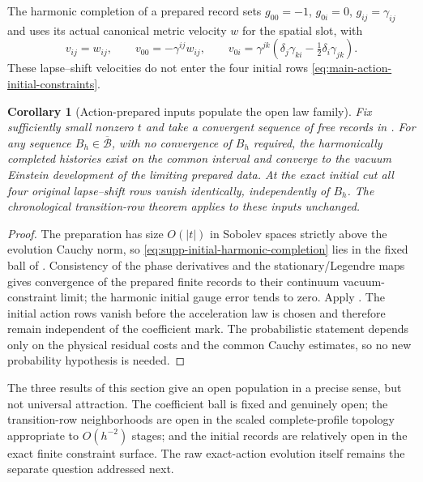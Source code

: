 \documentclass[11pt]{article}
\newtheorem{corollary}[corollary]{Corollary}
\theoremstyle{definition}
\theoremstyle{remark}
\begin{document}
The harmonic completion of a prepared record sets
$g_{00}=-1$, $g_{0i}=0$, $g_{ij}=\gamma_{ij}$ and uses its actual canonical
metric velocity $w$ for the spatial slot, with
\begin{equation}
 v_{ij}=w_{ij},\qquad
 v_{00}=-\gamma^{ij}w_{ij},\qquad
 v_{0i}=\gamma^{jk}\left(\delta_j\gamma_{ki}
             -\tfrac12\delta_i\gamma_{jk}\right).
 \label{eq:supp-initial-harmonic-completion}
\end{equation}
These lapse--shift velocities do not enter the four initial rows
\eqref{eq:main-action-initial-constraints}.

\begin{corollary}[Action-prepared inputs populate the open law family]
\label{cor:supp-action-prepared-einstein}
Fix sufficiently small nonzero $t$ and take a convergent sequence of free
records in .  For any sequence
$B_h\in\overline{\mathcal B}$, with no convergence of $B_h$ required, the
harmonically completed histories exist on the common interval and converge to
the vacuum Einstein development of the limiting prepared data.  At the exact
initial cut all four original lapse--shift rows vanish identically,
independently of $B_h$.  The chronological transition-row theorem
 applies to these inputs unchanged.
\end{corollary}
\begin{proof}
The preparation has size $O(|t|)$ in Sobolev spaces strictly above the
evolution Cauchy norm, so \eqref{eq:supp-initial-harmonic-completion} lies in
the fixed ball of .  Consistency of the phase
derivatives and the stationary/Legendre maps gives convergence of the
prepared finite records to their continuum vacuum-constraint limit; the
harmonic initial gauge error tends to zero.  Apply
.  The initial action rows vanish before the
acceleration law is chosen and therefore remain independent of the coefficient
mark.  The probabilistic statement depends only on the physical residual
costs and the common Cauchy estimates, so no new probability hypothesis is
needed.
\end{proof}

The three results of this section give an open population in a precise sense,
but not universal attraction.  The coefficient ball is fixed and genuinely
open; the transition-row neighborhoods are open in the scaled complete-profile
topology appropriate to $O(h^{-2})$ stages; and the initial records are
relatively open in the exact finite constraint surface.  The raw exact-action
evolution itself remains the separate question addressed next.
\end{document}
